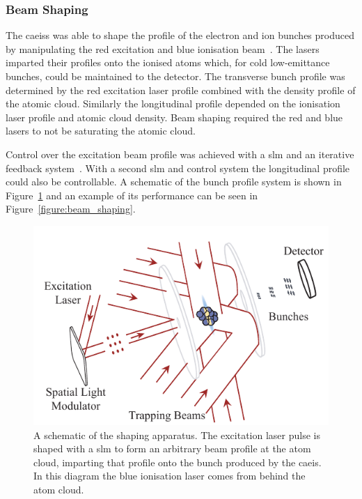 \subsubsection{Beam Shaping}

The \glspl{caeis} was able to shape the profile of the electron and ion bunches produced by manipulating the red excitation and blue ionisation beam~\cite{mcculloch_arbitrarily_2011}.
The lasers imparted their profiles onto the ionised atoms which, for cold low-emittance bunches, could be maintained to the detector.
The transverse bunch profile was determined by the red excitation laser profile combined with the density profile of the atomic cloud.
Similarly the longitudinal profile depended on the ionisation laser profile and atomic cloud density.
Beam shaping required the red and blue lasers to not be saturating the atomic cloud.

Control over the excitation beam profile was achieved with a \gls{slm} and an iterative feedback system~\cite{van_bijnen_patterned_2015}.
With a second \gls{slm} and control system the longitudinal profile could also be controllable.
A schematic of the bunch profile system is shown in Figure~\ref{figure:beam_shaping_schematic} and an example of its performance can be seen in Figure~\ref{figure:beam_shaping}.

\begin{figure}
    \center
    \includegraphics{part2/Figs/beam_shaping_schem.pdf}
    \caption[A schematic of the beam shaping apparatus.]{A schematic of the shaping apparatus. The excitation laser pulse is shaped with a \gls{slm} to form an arbitrary beam profile at the atom cloud, imparting that profile onto the bunch produced by the \gls{caeis}. In this diagram the blue ionisation laser comes from behind the atom cloud.}
    \label{figure:beam_shaping_schematic}
\end{figure}

